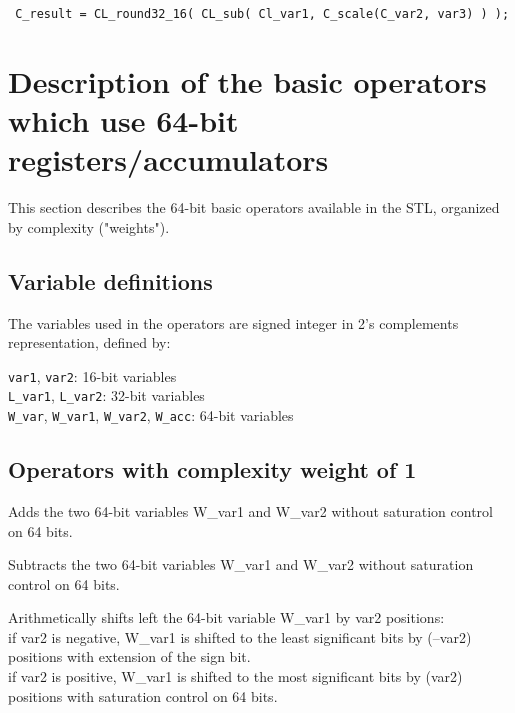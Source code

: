 {\tt {} C\_result = CL\_round32\_16( CL\_sub( Cl\_var1, C\_scale(C\_var2, var3) ) ); }


\section{Description of the basic operators which use 64-bit registers/accumulators} \label{basop64bitoperators}

This section describes the 64-bit basic operators available in the STL, organized by complexity ("weights").

\subsection{Variable definitions}

The variables used in the operators are signed integer in 2's complements representation, defined by:

{\tt var1}, {\tt var2}: 16-bit variables\\
{\tt L\_var1}, {\tt L\_var2}: 32-bit variables\\
{\tt W\_var}, {\tt W\_var1}, {\tt W\_var2}, {\tt W\_acc}: 64-bit variables


\subsection{Operators with complexity weight of 1}


Adds the two 64-bit variables W\_var1 and W\_var2 without saturation control on 64 bits.


Subtracts the two 64-bit variables W\_var1 and W\_var2 without saturation control on 64 bits.



Arithmetically shifts left the 64-bit variable W\_var1 by var2 positions:\\
if var2 is negative, W\_var1 is shifted to the least significant bits by (–var2) positions with extension of the sign bit.\\
if var2 is positive, W\_var1 is shifted to the most significant bits by (var2) positions with saturation control on 64 bits.


